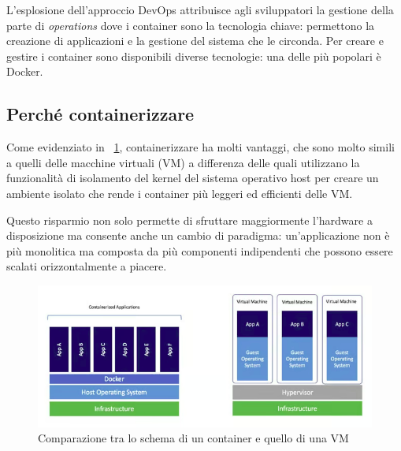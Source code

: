\documentclass[12pt, hidelinks]{report}
\begin{document}
L'esplosione dell'approccio DevOps attribuisce agli sviluppatori la gestione della parte di \textit{operations} dove i container sono la tecnologia chiave: permettono la creazione di applicazioni e la gestione del sistema che le circonda.
Per creare e gestire i container sono disponibili diverse tecnologie: una delle più popolari è Docker.

\subsection{Perché containerizzare}
Come evidenziato in \figurename~\ref{fig:container_vs_vm}, containerizzare ha molti vantaggi, che sono molto simili a quelli delle macchine virtuali (VM) a differenza delle quali utilizzano la funzionalità di isolamento del kernel del sistema operativo host per creare un ambiente isolato che rende i container più leggeri ed efficienti delle VM.

Questo risparmio non solo permette di sfruttare maggiormente l'hardware a disposizione ma consente anche un cambio di paradigma: un'applicazione non è più monolitica ma composta da più componenti indipendenti che possono essere scalati orizzontalmente a piacere.

\begin{figure}[h]
    \centering
    \includegraphics[width=\linewidth]{1_container_vs_vm.png}
    \caption{Comparazione tra lo schema di un container e quello di una VM \cite{container_vs_vm}}
    \label{fig:container_vs_vm}
\end{figure}
\end{document}
